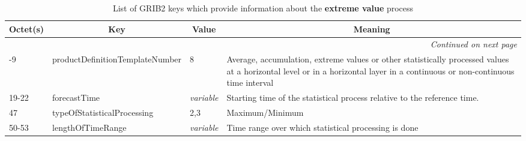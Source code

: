 \begin{longtable}{p{1.2cm}p{5.5cm}p{1.0cm}p{6.0cm}}
\caption[]{List of GRIB2 keys which provide information about the \textbf{extreme value} process}\label{tab_GRIB2extreme}\\
  \toprule
\multicolumn{1}{c}{\textbf{Octet(s)}}  &  \multicolumn{1}{c}{\textbf{Key}}  & \multicolumn{1}{c}{\textbf{Value}} & \multicolumn{1}{c}{\textbf{Meaning}} \\
\midrule
\endhead
\hline \multicolumn{4}{r}{\textit{Continued on next page}} \\
\endfoot
\endlastfoot
 8-9        &  productDefinitionTemplateNumber             &     8               &    Average, accumulation, extreme values or other statistically processed values at a horizontal level or in a horizontal layer in a continuous or non-continuous time interval   \\
 19-22      &  forecastTime                                &    \emph{variable}  &    Starting time of the statistical process relative to the reference time. \\
 47         &  typeOfStatisticalProcessing                 &     2,3             &    Maximum/Minimum                                  \\
 50-53      &  lengthOfTimeRange                           &    \emph{variable}  &    Time range over which statistical processing is done \\
\bottomrule
\end{longtable}

